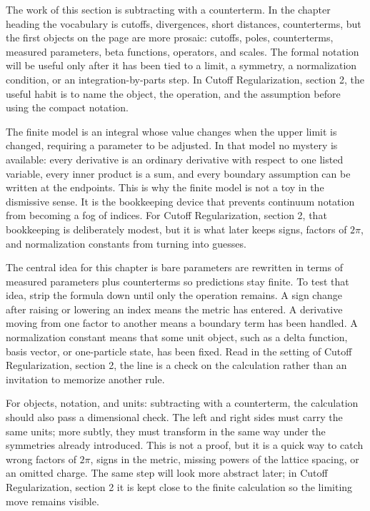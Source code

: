 The work of this section is subtracting with a counterterm.  In the chapter heading the vocabulary is cutoffs, divergences, short distances, counterterms, but the first objects on the page are more prosaic: cutoffs, poles, counterterms, measured parameters, beta functions, operators, and scales.  The formal notation will be useful only after it has been tied to a limit, a symmetry, a normalization condition, or an integration-by-parts step.  In Cutoff Regularization, section 2, the useful habit is to name the object, the operation, and the assumption before using the compact notation.

The finite model is an integral whose value changes when the upper limit is changed, requiring a parameter to be adjusted.  In that model no mystery is available: every derivative is an ordinary derivative with respect to one listed variable, every inner product is a sum, and every boundary assumption can be written at the endpoints.  This is why the finite model is not a toy in the dismissive sense.  It is the bookkeeping device that prevents continuum notation from becoming a fog of indices.  For Cutoff Regularization, section 2, that bookkeeping is deliberately modest, but it is what later keeps signs, factors of \(2\pi\), and normalization constants from turning into guesses.

The central idea for this chapter is bare parameters are rewritten in terms of measured parameters plus counterterms so predictions stay finite.  To test that idea, strip the formula down until only the operation remains.  A sign change after raising or lowering an index means the metric has entered.  A derivative moving from one factor to another means a boundary term has been handled.  A normalization constant means that some unit object, such as a delta function, basis vector, or one-particle state, has been fixed.  Read in the setting of Cutoff Regularization, section 2, the line is a check on the calculation rather than an invitation to memorize another rule.

For objects, notation, and units: subtracting with a counterterm, the calculation should also pass a dimensional check.  The left and right sides must carry the same units; more subtly, they must transform in the same way under the symmetries already introduced.  This is not a proof, but it is a quick way to catch wrong factors of \(2\pi\), signs in the metric, missing powers of the lattice spacing, or an omitted charge.  The same step will look more abstract later; in Cutoff Regularization, section 2 it is kept close to the finite calculation so the limiting move remains visible.

